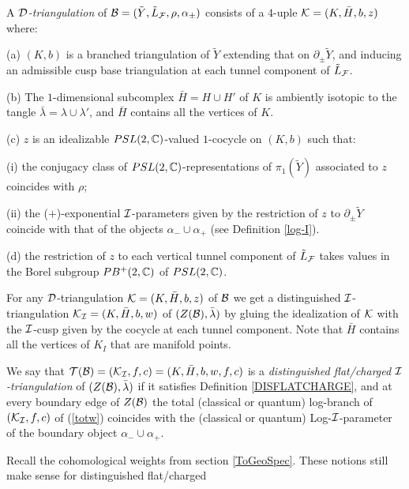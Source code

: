 \begin{defi}\label{Dtriang}{\rm A {\it ${\mathcal D}$-triangulation} of
${\mathcal B} =(\tilde{Y},\tilde{L}_{\mathcal F},\rho,\alpha_\pm)$ consists of a
$4$-uple ${\mathcal K} =(K,\bar{H},b,z)$ where:

\smallskip

(a) $(K,b)$ is a branched triangulation of $\tilde{Y}$ extending
that on $\partial_\pm \tilde{Y}$, and inducing an admissible cusp
base triangulation at each tunnel component of $\tilde{L}_{{\mathcal F}}$.

\smallskip

(b) The $1$-dimensional subcomplex $\bar{H}= H\cup H'$ of $K$ is
ambiently isotopic to the tangle $\bar{\lambda}=\lambda \cup
\lambda'$, and $\bar{H}$ contains
all the vertices of $K$.

\smallskip

(c) $z$ is an idealizable $PSL(2,{\mathbb C})$-valued $1$-cocycle on $(K,b)$
such that:

(i) the conjugacy class of $PSL(2,\mathbb{C})$-representations of $\pi_1(\tilde{Y})$
associated to $z$ coincides with $\rho$;

(ii) the ($+$)-exponential ${\mathcal I}$-parameters given by the
restriction of $z$ to $\partial_{\pm} \tilde{Y}$ coincide with
that of the objects $\alpha_- \cup \alpha_+$ (see Definition \ref{log-I}).
\smallskip

(d) the restriction of $z$ to each vertical tunnel component of
$\tilde{L}_{{\mathcal F}}$ takes values in the Borel subgroup $PB^+(2,\mathbb{C})$
of $PSL(2,\mathbb{C})$.}
\end{defi}
For any ${\mathcal D}$-triangulation ${\mathcal K} =(K,\bar{H},b,z)$ of ${\mathcal B}$ we get
a distinguished ${\mathcal I}$-triangulation ${\mathcal K}_{\mathcal I}=(K,\bar{H},b,w)$ of
$(Z({\mathcal B}), \bar{\lambda})$ by gluing the idealization of ${\mathcal K}$ with
the ${\mathcal I}$-cusp given by the cocycle at each tunnel component. Note
that $\bar{H}$ contains all the vertices of $K_I$ that are
manifold points.
\begin{defi}\label{flat/charge-def} {\rm We say that $\mathcal{T}(\mathcal{B})
=({\mathcal K}_{\mathcal I},f,c) = (K,\bar{H},b,w,f,c)$ is a {\it distinguished
  flat/charged ${\mathcal I}$-triangulation} of $(Z({\mathcal B}),\bar{\lambda})$ if it
satisfies Definition \ref{DISFLATCHARGE}, and at every boundary edge
of $Z({\mathcal B})$ the total (classical or quantum) log-branch of
$({\mathcal K}_{\mathcal I},f,c)$ of (\ref{totw}) coincides with the (classical or
quantum) Log-${\mathcal I}$-parameter of the boundary object $\alpha_- \cup
\alpha_+$. }
\end{defi}
Recall the cohomological weights from section \ref{ToGeoSpec}.  These
notions still make sense for distinguished flat/charged
